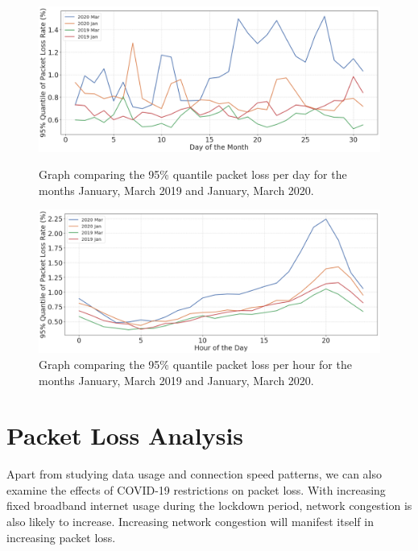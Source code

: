 \begin{figure}[t]
  \begin{minipage}[t]{0.496\linewidth}
    \centering
    \includegraphics[width=0.98\linewidth]{figs/packet_loss_per_day.png}
    \caption{Graph comparing the 95\% quantile packet loss per day for the months January, March 2019 and January, March 2020.}
    \label{fig:packetlossperday}
  \end{minipage}
  \begin{minipage}[t]{0.496\linewidth}
    \centering
    \includegraphics[width=0.98\linewidth]{figs/packet_loss_per_hour.png}
    \caption{Graph comparing the 95\% quantile packet loss per hour for the months January, March 2019 and January, March 2020.}
    \label{fig:packetlossperhour}
  \end{minipage}
\end{figure}

\section{Packet Loss Analysis}
\label{sec:packet-loss-analysis}

Apart from studying data usage and connection speed patterns, we can also examine the effects of COVID-19 restrictions on packet loss. With increasing fixed broadband internet usage during the lockdown period, network congestion is also likely to increase. Increasing network congestion will manifest itself in increasing packet loss.

